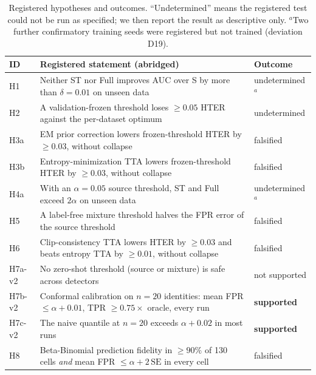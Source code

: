 \begin{table}[t]
\centering
\small
\setlength{\tabcolsep}{4pt}
\caption{Registered hypotheses and outcomes. ``Undetermined'' means the registered test could not be run as specified; we then report the result as descriptive only. $^a$Two further confirmatory training seeds were registered but not trained (deviation D19).}
\label{tab:hyp}
\begin{tabular}{l p{8.9cm} l}
\toprule
ID & Registered statement (abridged) & Outcome \\
\midrule
H1 & Neither ST nor Full improves AUC over S by more than $\delta=0.01$ on unseen data & undetermined$^a$ \\
H2 & A validation-frozen threshold loses $\ge0.05$ HTER against the per-dataset optimum & undetermined \\
H3a & EM prior correction lowers frozen-threshold HTER by $\ge0.03$, without collapse & falsified \\
H3b & Entropy-minimization TTA lowers frozen-threshold HTER by $\ge0.03$, without collapse & falsified \\
H4a & With an $\alpha=0.05$ source threshold, ST and Full exceed $2\alpha$ on unseen data & undetermined$^a$ \\
H5 & A label-free mixture threshold halves the FPR error of the source threshold & falsified \\
H6 & Clip-consistency TTA lowers HTER by $\ge0.03$ and beats entropy TTA by $\ge0.01$, without collapse & falsified \\
H7a-v2 & No zero-shot threshold (source or mixture) is safe across detectors & not supported \\
H7b-v2 & Conformal calibration on $n=20$ identities: mean FPR $\le\alpha+0.01$, TPR $\ge0.75\times$ oracle, every run & \textbf{supported} \\
H7c-v2 & The naive quantile at $n=20$ exceeds $\alpha+0.02$ in most runs & \textbf{supported} \\
H8 & Beta-Binomial prediction fidelity in $\ge90\%$ of 130 cells \emph{and} mean FPR $\le\alpha+2\,\mathrm{SE}$ in every cell & falsified \\
\bottomrule
\end{tabular}
\end{table}
